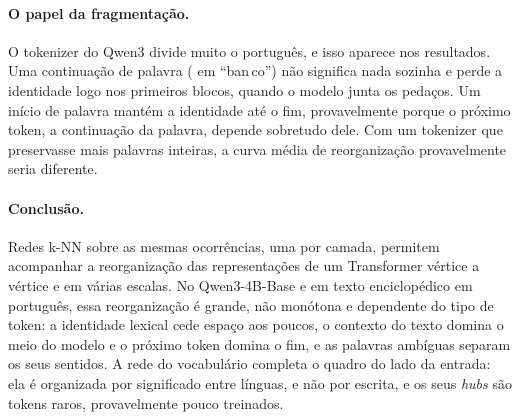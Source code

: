 \paragraph{O papel da fragmentação.} O tokenizer do Qwen3 divide muito o português, e isso
aparece nos resultados. Uma continuação de palavra ( em ``ban\,co'') não significa nada
sozinha e perde a identidade logo nos primeiros blocos, quando o modelo junta os pedaços. Um
início de palavra mantém a identidade até o fim, provavelmente porque o próximo token, a
continuação da palavra, depende sobretudo dele. Com um tokenizer que preservasse mais palavras
inteiras, a curva média de reorganização provavelmente seria diferente.

\paragraph{Conclusão.} Redes k-NN sobre as mesmas ocorrências, uma por camada, permitem
acompanhar a reorganização das representações de um Transformer vértice a vértice e em várias
escalas. No Qwen3-4B-Base e em texto enciclopédico em português, essa reorganização é grande,
não monótona e dependente do tipo de token: a identidade lexical cede espaço aos poucos, o
contexto do texto domina o meio do modelo e o próximo token domina o fim, e as palavras
ambíguas separam os seus sentidos. A rede do vocabulário completa o quadro do lado da entrada:
ela é organizada por significado entre línguas, e não por escrita, e os seus \emph{hubs} são
tokens raros, provavelmente pouco treinados.
